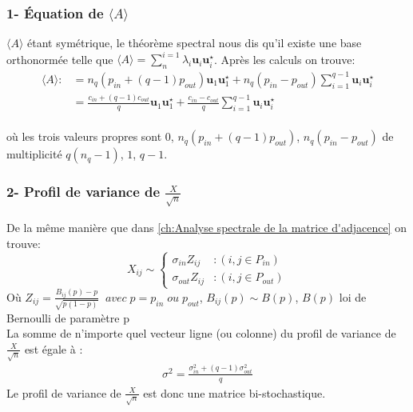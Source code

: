 \subsubsection*{1- Équation de $\langle A \rangle$}
$\langle A \rangle$ étant symétrique, le théorème spectral nous dis qu'il existe une base orthonormée telle que $\langle A \rangle = \sum_{n}^{i=1}\lambda_i\mathbf{u}_i\mathbf{u}_i^{\star}$.
Après les calculs on trouve:
\begin{align} 
\langle A \rangle :&= n_q(p_{in} + (q-1)p_{out}) \mathbf{u}_1\mathbf{u}_1^{\star} + n_q(p_{in}-p_{out})\sum_{i=1}^{q-1}\mathbf{u}_i\mathbf{u}_i^{\star}\\
				   &= \frac{c_{in} + (q-1)c_{out}}{q} \mathbf{u}_1\mathbf{u}_1^{\star} + \frac{c_{in}-c_{out}}{q}\sum_{i=1}^{q-1}\mathbf{u}_i\mathbf{u}_i^{\star}
\end{align}\\
où les trois valeurs propres sont $0$, $n_q(p_{in} + (q-1)p_{out})$, $n_q(p_{in}-p_{out})$ de multiplicité $q(n_q - 1)$, $1$, $q-1$.\\

\subsubsection*{2- Profil de variance de $\frac{X}{\sqrt{n}}$}
De la même manière que dans \autoref{ch:Analyse spectrale de la matrice d'adjacence} on trouve:
\begin{equation}
	X_{ij} \sim \left\{
	\begin{array}{lr}
		\sigma_{in} Z_{ij} & : (i,j \in P_{in}) \\
		\sigma_{out} Z_{ij} & : (i,j \in P_{out})
	\end{array}
\right.\nonumber
\end{equation}
Où $Z_{ij} = \frac{B_{ij}(p) - p}{\sqrt{p(1-p)}} \;\;avec \; p = p_{in} \; ou \; p_{out}$, $B_{ij}(p) \sim B(p)$, $B(p)$ loi de Bernoulli de paramètre p\\
La somme de n'importe quel vecteur ligne (ou colonne) du profil de variance de $\frac{X}{\sqrt{n}}$ est égale à : 
\begin{align}
\label{eq:sigma2} 
\sigma^2 = \frac{\sigma_{in}^2 + (q-1)\sigma_{out}^2}{q}
\end{align}
Le profil de variance de $\frac{X}{\sqrt{n}}$ est donc une matrice bi-stochastique.\\

